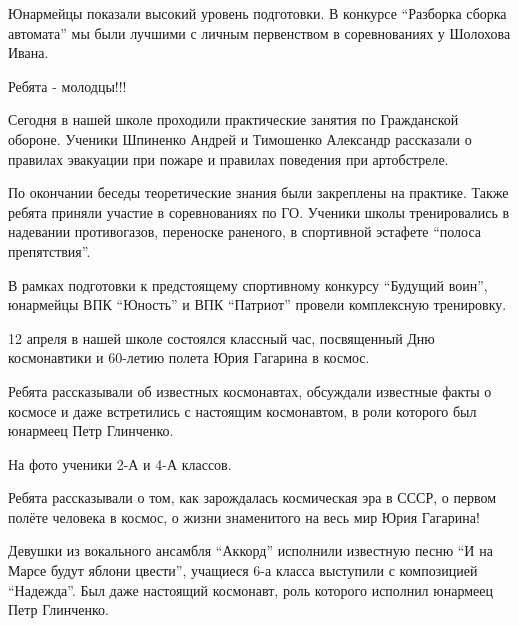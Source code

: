 Юнармейцы показали высокий уровень подготовки. В конкурсе \enquote{Разборка
сборка автомата} мы были лучшими с личным первенством в соревнованиях у
Шолохова Ивана. 

Ребята - молодцы!!!



Сегодня в нашей школе проходили практические занятия по Гражданской обороне.
Ученики Шпиненко Андрей и Тимошенко Александр рассказали о правилах эвакуации
при пожаре и правилах поведения при артобстреле.

По окончании беседы теоретические знания были закреплены на практике. Также
ребята приняли участие в соревнованиях по ГО. Ученики школы тренировались в
надевании противогазов, переноске раненого, в спортивной эстафете \enquote{полоса
препятствия}.

В рамках подготовки к предстоящему спортивному конкурсу \enquote{Будущий воин},
юнармейцы ВПК \enquote{Юность} и ВПК \enquote{Патриот} провели комплексную тренировку.



12 апреля  в нашей школе состоялся классный час, посвященный Дню космонавтики и
60-летию полета Юрия Гагарина в космос.

Ребята рассказывали об известных космонавтах, обсуждали известные факты о
космосе и даже встретились с настоящим космонавтом, в роли которого был
юнармеец Петр Глинченко.

На фото ученики 2-А и 4-А классов.



Ребята рассказывали о том, как зарождалась космическая эра в СССР, о первом
полёте человека в космос, о жизни знаменитого на весь мир Юрия Гагарина!

Девушки из вокального ансамбля \enquote{Аккорд} исполнили известную песню \enquote{И на Марсе
будут яблони цвести}, учащиеся 6-а класса выступили с композицией \enquote{Надежда}.
Был даже настоящий космонавт, роль которого исполнил юнармеец Петр Глинченко.


